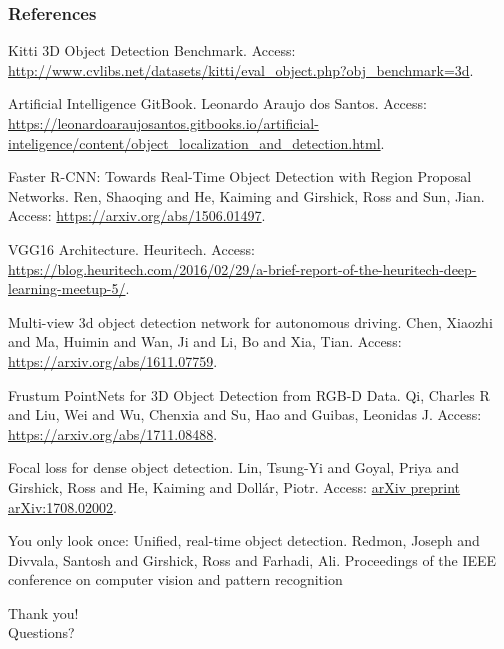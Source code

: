 \documentclass[10pt,fleqn,unknownkeysallowed]{beamer}
\begin{document}
\begin{frame}
	\frametitle{References}
	\tiny
	\begin{thebibliography}{9}
		\def\bibfont{\small}
		Kitti 3D Object Detection Benchmark.
		Access: {\url{http://www.cvlibs.net/datasets/kitti/eval_object.php?obj_benchmark=3d}}.
		
		Artificial Intelligence GitBook.
		Leonardo Araujo dos Santos.
		Access: {\url{https://leonardoaraujosantos.gitbooks.io/artificial-inteligence/content/object_localization_and_detection.html}}.
		
		Faster {R-CNN}: Towards Real-Time Object Detection with Region Proposal Networks.
		Ren, Shaoqing and He, Kaiming and Girshick, Ross and Sun, Jian.
		Access: {\url{https://arxiv.org/abs/1506.01497}}.
		
		VGG16 Architecture.
		Heuritech.
		Access: {\url{https://blog.heuritech.com/2016/02/29/a-brief-report-of-the-heuritech-deep-learning-meetup-5/}}.
				
		Multi-view 3d object detection network for autonomous driving.
		Chen, Xiaozhi and Ma, Huimin and Wan, Ji and Li, Bo and Xia, Tian.
		Access: {\url{https://arxiv.org/abs/1611.07759}}.
		
		Frustum PointNets for 3D Object Detection from RGB-D Data.
		Qi, Charles R and Liu, Wei and Wu, Chenxia and Su, Hao and Guibas, Leonidas J.
		Access: {\url{https://arxiv.org/abs/1711.08488}}.
		
		Focal loss for dense object detection.
		Lin, Tsung-Yi and Goyal, Priya and Girshick, Ross and He, Kaiming and Doll{\'a}r, Piotr.
		Access: {\url{arXiv preprint arXiv:1708.02002}}.
		
		You only look once: Unified, real-time object detection.
		Redmon, Joseph and Divvala, Santosh and Girshick, Ross and Farhadi, Ali.
		Proceedings of the IEEE conference on computer vision and pattern recognition	
		
	\end{thebibliography}
\end{frame}


\begin{frame}
	\begin{center}
		\huge Thank you! \\ Questions?
	\end{center}
\end{frame}
\end{document}
